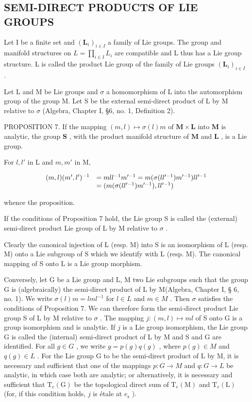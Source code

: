 \subsection{SEMI-DIRECT PRODUCTS OF LIE GROUPS}

Let I be a finite set and \((\mathbf{L}_{i})_{i\in I}\) a family of Lie groups. The group and manifold structures on \(L=\prod_{i\in I}L_{i}\) are compatible and L thus has a Lie group structure. L is called the product Lie group of the family of Lie groups \((\mathbf{L}_{i})_{i\in I}\) .

Let L and M be Lie groups and \(\sigma\) a homomorphism of L into the automorphism group of the group M. Let S be the external semi-direct product of L by M relative to \(\sigma\) (Algebra, Chapter I, §6, no. 1, Definition 2).

PROPOSITION 7. If the mapping \((m, l) \mapsto \sigma(l)m\) of \(\mathbf{M} \times \mathbf{L}\) into \(\mathbf{M}\) is analytic, the group \(\mathbf{S}\) , with the product manifold structure of \(\mathbf{M}\) and \(\mathbf{L}\) , is a Lie group.

For \(l, l'\) in L and \(m, m'\) in M,

\[
\begin{array}{r l} (m, l) (m ^ {\prime}, l ^ {\prime}) ^ {- 1} & = m l l ^ {- 1} m ^ {\prime - 1} = m (\sigma (l l ^ {\prime - 1}) m ^ {\prime - 1}) l l ^ {\prime - 1} \\ & = (m (\sigma (l l ^ {\prime - 1}) m ^ {\prime - 1}), l l ^ {\prime - 1}) \end{array}
\]

whence the proposition.

If the conditions of Proposition 7 hold, the Lie group S is called the (external) semi-direct product Lie group of L by M relative to \(\sigma\) .

Clearly the canonical injection of L (resp. M) into S is an isomorphism of L (resp. M) onto a Lie subgroup of S which we identify with L (resp. M). The canonical mapping of S onto L is a Lie group morphism.

Conversely, let G be a Lie group and L, M two Lie subgroups such that the group G is (algebraically) the semi-direct product of L by M(Algebra, Chapter I, § 6, no. 1). We write \(\sigma(l)m = lml^{-1}\) for \(l \in L\) and \(m \in M\) . Then \(\sigma\) satisfies the conditions of Proposition 7. We can therefore form the semi-direct product Lie group S of L by M relative to \(\sigma\) . The mapping \(j: (m, l) \mapsto ml\) of S onto G is a group isomorphism and is analytic. If \(j\) is a Lie group isomorphism, the Lie group G is called the (internal) semi-direct product of L by M and S and G are identified. For all \(g \in G\) , we write \(g = p(g)q(g)\) , where \(p(g) \in M\) and \(q(g) \in L\) . For the Lie group G to be the semi-direct product of L by M, it is necessary and sufficient that one of the mappings \(p: G \to M\) and \(q: G \to L\) be analytic, in which case both are analytic; or alternatively, it is necessary and sufficient that \(\mathrm{T}_{e}(\mathrm{G})\) be the topological direct sum of \(\mathrm{T}_{e}(\mathrm{M})\) and \(\mathrm{T}_{e}(\mathrm{L})\) (for, if this condition holds, \(j\) is étale at \(e_{\mathrm{s}}\) ).

